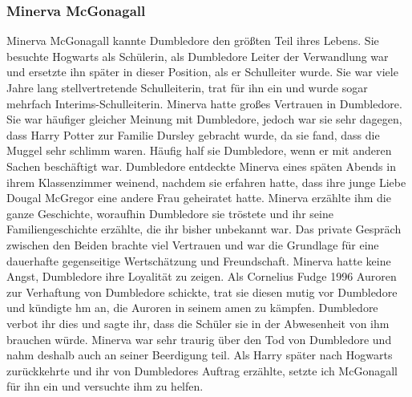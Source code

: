 \documentclass[a4paper, 10pt]{article}
\begin{document}
\subsubsection*{\large Minerva McGonagall}
Minerva McGonagall kannte Dumbledore den größten Teil ihres Lebens. Sie besuchte Hogwarts als Schülerin, als Dumbledore Leiter der Verwandlung war und ersetzte ihn später in dieser Position, als er Schulleiter wurde. Sie war viele Jahre lang
stellvertretende Schulleiterin, trat für ihn ein und wurde sogar mehrfach Interims-Schulleiterin.
\vspace{10pt}
\newline
{}  
Minerva hatte großes Vertrauen in Dumbledore. Sie war häufiger gleicher Meinung mit Dumbledore, jedoch war sie sehr dagegen, dass Harry Potter zur Familie Dursley gebracht wurde, da sie fand, dass die Muggel sehr schlimm waren. Häufig half sie Dumbledore, wenn er mit anderen Sachen beschäftigt war.
\vspace{10pt}
\newline
{}  
Dumbledore entdeckte Minerva eines späten Abends in ihrem Klassenzimmer weinend, nachdem sie erfahren hatte, dass ihre junge Liebe Dougal McGregor eine andere Frau geheiratet hatte. Minerva erzählte ihm die ganze Geschichte, woraufhin Dumbledore sie tröstete und ihr seine Familiengeschichte erzählte, die ihr bisher unbekannt war. Das private Gespräch zwischen den Beiden brachte viel Vertrauen und war die Grundlage für eine dauerhafte gegenseitige Wertschätzung und Freundschaft.
\vspace{10pt}
\newline
{}  
Minerva hatte keine Angst, Dumbledore ihre Loyalität zu zeigen. Als Cornelius Fudge 1996 Auroren zur Verhaftung von Dumbledore schickte, trat sie diesen mutig vor Dumbledore und kündigte hm an, die Auroren in seinem amen zu kämpfen. Dumbledore verbot ihr dies und sagte ihr, dass die Schüler sie in der Abwesenheit von ihm brauchen würde.
\vspace{10pt}
\newline
{}  
Minerva war sehr traurig über den Tod von Dumbledore und nahm deshalb auch an seiner Beerdigung teil. Als Harry später nach Hogwarts zurückkehrte und ihr von Dumbledores Auftrag erzählte, setzte ich McGonagall für ihn ein und versuchte ihm zu helfen.
\end{document}
